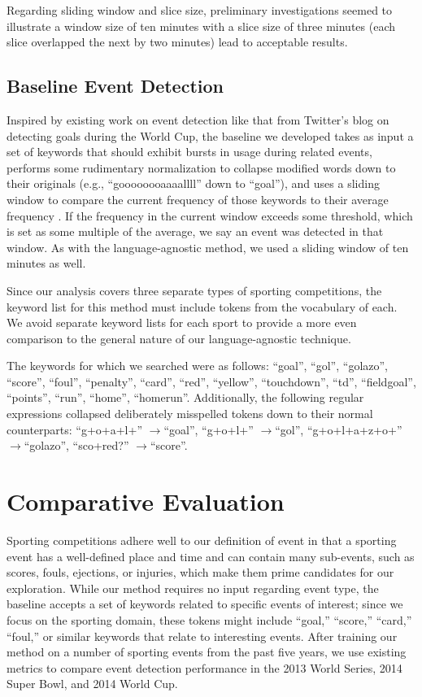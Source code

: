 \documentclass{acm_proc_article-sp}
\begin{document}
Regarding sliding window and slice size, preliminary investigations seemed to illustrate a window size of ten minutes with a slice size of three minutes (each slice overlapped the next by two minutes) lead to acceptable results.

\subsection{Baseline Event Detection}

Inspired by existing work on event detection like that from Twitter's blog on detecting goals during the World Cup, the baseline we developed takes as input a set of keywords that should exhibit bursts in usage during related events, performs some rudimentary normalization to collapse modified words down to their originals (e.g., ``goooooooaaaallll'' down to ``goal''), and uses a sliding window to compare the current frequency of those keywords to their average frequency \cite{Cipriani2014}.
If the frequency in the current window exceeds some threshold, which is set as some multiple of the average, we say an event was detected in that window.
As with the language-agnostic method, we used a sliding window of ten minutes as well.

Since our analysis covers three separate types of sporting competitions, the keyword list for this method must include tokens from the vocabulary of each. 
We avoid separate keyword lists for each sport to provide a more even comparison to the general nature of our language-agnostic technique.

The keywords for which we searched were as follows: ``goal'', ``gol'', ``golazo'', ``score'', ``foul'', ``penalty'', ``card'', ``red'', ``yellow'', ``touchdown'', ``td'', ``fieldgoal'', ``points'', ``run'', ``home'', ``homerun''.
Additionally, the following regular expressions collapsed deliberately misspelled tokens down to their normal counterparts: ``g+o+a+l+'' $\rightarrow$``goal'', ``g+o+l+'' $\rightarrow$``gol'', ``g+o+l+a+z+o+'' $\rightarrow$``golazo'', ``sco+red?'' $\rightarrow$``score''.

\section{Comparative Evaluation}

Sporting competitions adhere well to our definition of event in that a sporting event has a well-defined place and time and can contain many sub-events, such as scores, fouls, ejections, or injuries, which make them prime candidates for our exploration.
While our method requires no input regarding event type, the baseline accepts a set of keywords related to specific events of interest; since we focus on the sporting domain, these tokens might include ``goal,'' ``score,'' ``card,'' ``foul,'' or similar keywords that relate to interesting events.
After training our method on a number of sporting events from the past five years, we use existing metrics to compare event detection performance in the 2013 World Series, 2014 Super Bowl, and 2014 World Cup.
\end{document}
